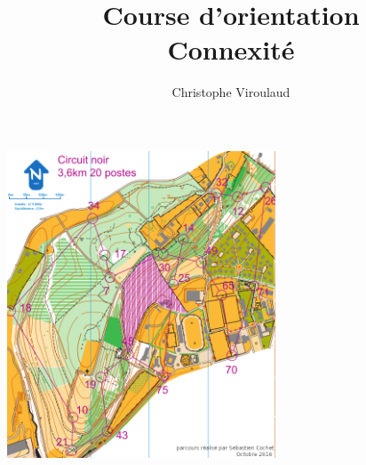 \documentclass[svgnames,11pt]{beamer}
\author[]{Christophe Viroulaud}
\title{Course d'orientation\\Connexité}
\date{\framebox{\textbf{Algo 17}}}
\institute{Terminale - NSI}
\begin{document}
\begin{frame}
    \titlepage
\end{frame}
\begin{frame}
    \frametitle{}

    \begin{center}
    \centering
    \includegraphics[width=8cm]{ressources/co-noir.png}
  
    \end{center}

\end{frame}
\end{document}
